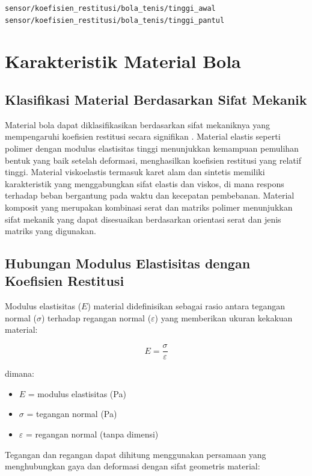 \begin{verbatim}
sensor/koefisien_restitusi/bola_tenis/tinggi_awal
sensor/koefisien_restitusi/bola_tenis/tinggi_pantul
\end{verbatim}

\section{Karakteristik Material Bola}

\subsection{Klasifikasi Material Berdasarkan Sifat Mekanik}
Material bola dapat diklasifikasikan berdasarkan sifat mekaniknya yang mempengaruhi koefisien restitusi secara signifikan \citep{kalnins2018separation}. Material elastis seperti polimer dengan modulus elastisitas tinggi menunjukkan kemampuan pemulihan bentuk yang baik setelah deformasi, menghasilkan koefisien restitusi yang relatif tinggi. Material viskoelastis termasuk karet alam dan sintetis memiliki karakteristik yang menggabungkan sifat elastis dan viskos, di mana respons terhadap beban bergantung pada waktu dan kecepatan pembebanan. Material komposit yang merupakan kombinasi serat dan matriks polimer menunjukkan sifat mekanik yang dapat disesuaikan berdasarkan orientasi serat dan jenis matriks yang digunakan.

\subsection{Hubungan Modulus Elastisitas dengan Koefisien Restitusi}
Modulus elastisitas ($E$) material didefinisikan sebagai rasio antara tegangan normal ($\sigma$) terhadap regangan normal ($\varepsilon$) yang memberikan ukuran kekakuan material:

\begin{equation}
    E = \frac{\sigma}{\varepsilon}
\end{equation}

dimana:
\begin{itemize}
    \item $E$ = modulus elastisitas (Pa)
    \item $\sigma$ = tegangan normal (Pa)
    \item $\varepsilon$ = regangan normal (tanpa dimensi)
\end{itemize}

Tegangan dan regangan dapat dihitung menggunakan persamaan yang menghubungkan gaya dan deformasi dengan sifat geometris material:

